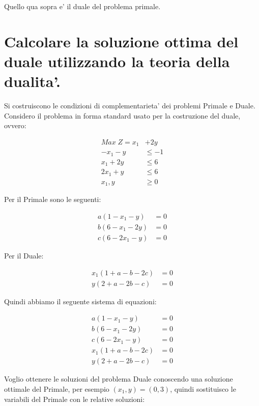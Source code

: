 \documentclass[a4paper,12pt,oneside]{article}
\begin{document}
    Quello qua sopra e' il duale del problema primale.
    
    \newpage
    \section{Calcolare la soluzione ottima del duale utilizzando la teoria della dualita'.}
    
    Si costruiscono le condizioni di complementarieta' dei problemi Primale e Duale.
    Considero il problema in forma standard usato per la costruzione del duale, ovvero:
    
    \begin{align*}
        Max \; Z = x_1 &+ 2 y \\
        -x_1 - y & \leq -1 \\
        x_1 + 2 y & \leq 6 \\
        2 x_1 + y & \leq 6 \\
        x_1, y & \geq 0
    \end{align*}

    Per il Primale sono le seguenti:

    \begin{align*}
        a (1 - x_1 - y) & = 0 \\
        b (6 - x_1 - 2 y) & = 0 \\
        c (6 - 2 x_1 - y) & = 0
    \end{align*}

    Per il Duale:

    \begin{align*}
        x_1 (1 + a - b - 2 c) &= 0 \\
        y (2 + a - 2 b - c) &= 0
    \end{align*}

    Quindi abbiamo il seguente sistema di equazioni:

    \begin{align*}
        a (1 - x_1 - y) & = 0 \\
        b (6 - x_1 - 2 y) & = 0 \\
        c (6 - 2 x_1 - y) & = 0 \\
        x_1 (1 + a - b - 2 c) &= 0 \\
        y (2 + a - 2 b - c) &= 0
    \end{align*}

    Voglio ottenere le soluzioni del problema Duale conoscendo una soluzione ottimale del Primale, per esempio $(x_1, y) = (0, 3)$, quindi sostituisco le variabili del Primale con le relative soluzioni:
\end{document}

